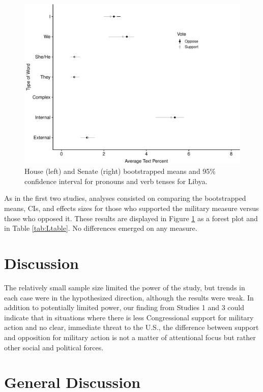 \documentclass[english,,man,floatsintext]{apa6}
\begin{document}
\begin{figure}
\centering
\includegraphics{Language_of_War_Markdown_KJ2_files/figure-latex/Lpic-1.pdf}
\caption{\label{fig:Lpic}House (left) and Senate (right) bootstrapped means and 95\% confidence interval for pronouns and verb tenses for Libya.}
\end{figure}

As in the first two studies, analyses consisted on comparing the bootstrapped means, CIs, and effects sizes for those who supported the military measure versus those who opposed it. These results are displayed in Figure \ref{fig:Lpic} as a forest plot and in Table \ref{tab:Ltable}. No differences emerged on any measure.

\hypertarget{discussion-2}{%
\section{Discussion}\label{discussion-2}}

The relatively small sample size limited the power of the study, but trends in each case were in the hypothesized direction, although the results were weak. In addition to potentially limited power, our finding from Studies 1 and 3 could indicate that in situations where there is less Congressional support for military action and no clear, immediate threat to the U.S., the difference between support and opposition for military action is not a matter of attentional focus but rather other social and political forces.

\hypertarget{general-discussion}{%
\section{General Discussion}\label{general-discussion}}
\end{document}

